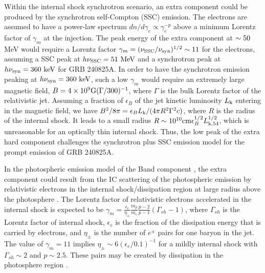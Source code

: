 \documentclass[twocolumn]{aastex631}
\begin{document}
Within the internal shock synchrotron scenario,  an extra component could be produced by the synchrotron self-Compton (SSC) emission. The electrons are assumed to have a power-law spectrum $dn/d\gamma_e\propto \gamma_e^{-p}$ above a minimum Lorentz factor of $\gamma_m$ at the injection.  The peak energy of the extra component at ${\rm \sim 50}$ MeV would require a Lorentz factor  $\gamma_m=(\nu_{\rm SSC}/\nu_{\rm syn})^{1/2}\sim 11$ for the electrons, assuming a SSC peak at $h\nu_{\rm SSC}=51~{\rm MeV}$  and a synchrotron peak at $h\nu_{\rm syn}=360~{\rm keV}$ for GRB 240825A. In order to have the synchrotron emission peaking at $h\nu_{\rm syn}=360~{\rm keV}$,  such a low $\gamma_m$ would require an extremely large magnetic field, $B=4\times 10^9 {\rm G} (\Gamma/300)^{-1}$, where $\Gamma$ is the bulk Lorentz factor of the relativistic jet. Assuming a fraction of $\epsilon_B$ of the jet kinetic luminosity $L_{\rm k}$ entering in the magnetic field, we have $B^2/8\pi=\epsilon_B L_{\rm k}/(4\pi R^2 \Gamma^2 c)$, where $R$ is the radius of the internal shock. It leads to a small radius $R\sim 10^{10}{\rm cm} \epsilon_B^{1/2} L_{\rm k,54}^{1/2}$, which is unreasonable for an optically thin internal shock. Thus, the low peak of the extra hard component   challenges the synchrotron plus SSC emission model for the prompt emission of GRB 240825A.



In the photospheric
emission model of the Band component \citep[e.g.,][]{2000ApJ...530..292M}, the extra component
could result from the IC scattering of the photospheric emission by relativistic electrons in the internal shock/dissipation region at large
radius above the photosphere \citep{2009ApJ...703.1044B,2009ApJ...706L..33G,2010ApJ...709L.172R,2011MNRAS.415.1663T}. The Lorentz factor of relativistic electrons accelerated in the internal shock is expected to be $\gamma_m=\frac{\epsilon_e}{\eta_\pm} \frac{m_p}{m_e}\frac{p-2}{p-1}(\Gamma_{sh}-1) $, where $\Gamma_{sh}$ is the Lorentz factor of internal shock, $\epsilon_e$ is the fraction of the dissipation energy
that is carried by electrons, and $\eta_\pm$ is the number of $e^\pm$ pairs for one baryon in the jet.  The  value of $\gamma_m= 11$  implies $\eta_\pm\sim 6 (\epsilon_e/0.1)^{-1}$ for a mildly internal shock with  $\Gamma_{sh}\sim 2$  and  $p\sim 2.5$. These  pairs may
be created by dissipation in the photosphere region \citep{2011MNRAS.415.1663T}.
\end{document}
